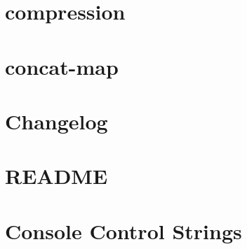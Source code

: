 \documentclass[twoside]{book}
\newcommand{\+}{\discretionary{\mbox{\scriptsize$\hookleftarrow$}}{}{}}
\begin{document}
\chapter{compression}
\label{md__c___users_vaishnavi_jadhav__desktop__developer_code_mean_stack_example_client_node_modules_compression__r_e_a_d_m_e}

\chapter{concat-\/map}
\label{md__c___users_vaishnavi_jadhav__desktop__developer_code_mean_stack_example_client_node_modules_concat_map__r_e_a_d_m_e}

\chapter{Changelog}
\label{md__c___users_vaishnavi_jadhav__desktop__developer_code_mean_stack_example_client_node_modules_c94c0a50ac8124ca52a0427400d982cc3}

\chapter{README}
\label{md__c___users_vaishnavi_jadhav__desktop__developer_code_mean_stack_example_client_node_modules_ceb19647740375d5a085cbfc820de6368}

\chapter{Console Control Strings}
\label{md__c___users_vaishnavi_jadhav__desktop__developer_code_mean_stack_example_client_node_modules_c89d128c230a5c7ca5d3043d0271f8e87}

\end{document}
